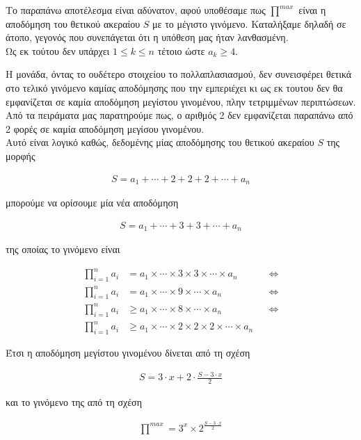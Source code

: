 \documentclass[12pt]{article}
\newcommand{\centered}[1]{\begin{align*}#1\end{align*}}
\begin{document}
Το παραπάνω αποτέλεσμα είναι αδύνατον, αφού υποθέσαμε πως \( \stackrel{max}{\prod} \) είναι η αποδόμηση του θετικού ακεραίου
\( S \) με το μέγιστο γινόμενο. Καταλήξαμε δηλαδή σε άτοπο, γεγονός που συνεπάγεται ότι η υπόθεση μας ήταν λανθασμένη. \\

Ως εκ τούτου δεν υπάρχει \( 1 \leq k \leq n \) τέτοιο ώστε \( a_k \geq 4 \). \\

\pagebreak

Η μονάδα, όντας το ουδέτερο στοιχείου το πολλαπλασιασμού, δεν συνεισφέρει θετικά στο τελικό γινόμενο καμίας αποδόμησης
που την εμπεριέχει κι ως εκ τουτου δεν θα εμφανίζεται σε καμία αποδόμηση μεγίστου γινομένου, πλην τετριμμένων περιπτώσεων. \\

Από τα πειράματα μας παρατηρούμε πως, ο αριθμός 2 δεν εμφανίζεται παραπάνω από 2 φορές σε καμία αποδόμηση μεγίσου γινομένου. \\

Αυτό είναι λογικό καθώς, δεδομένης μίας αποδόμησης του θετικού ακεραίου \( S \) της μορφής

\centered{S = a_1 + \dotsb + 2 + 2 + 2 + \dotsb + a_n}

μπορούμε να ορίσουμε μία νέα αποδόμηση

\centered{S = a_1 + \dotsb + 3 + 3 + \dotsb + a_n}

της οποίας το γινόμενο είναι

\begin{align*}
    \prod_{i = 1}^{n} a_i & = a_1 \times \dotsb \times 3 \times 3 \times \dotsb \times a_n && \Leftrightarrow \\
    \prod_{i = 1}^{n} a_i & = a_1 \times \dotsb \times 9 \times \dotsb \times a_n && \Leftrightarrow \\
    \prod_{i = 1}^{n} a_i & \geq a_1 \times \dotsb \times 8 \times \dotsb \times a_n && \Leftrightarrow \\
    \prod_{i = 1}^{n} a_i & \geq a_1 \times \dotsb \times 2 \times 2 \times 2 \times \dotsb \times a_n
\end{align*}

Έτσι η αποδόμηση μεγίστου γινομένου δίνεται από τη σχέση

\centered{S = 3 \cdot x + 2 \cdot \frac{S - 3 \cdot x}{2}}

και το γινόμενο της από τη σχέση

\centered{\stackrel{max}{\prod} = 3^x \times 2^{\frac{S - 3 \cdot x}{2}}}
\end{document}
